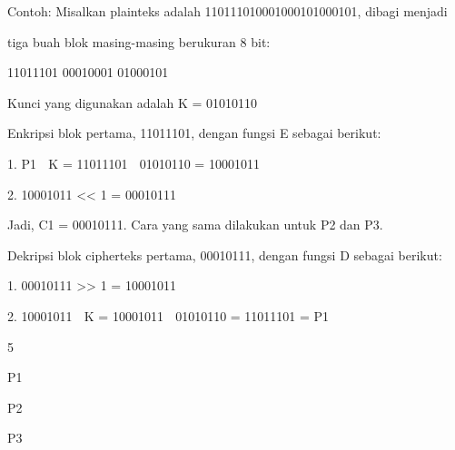 \documentclass{article}
\begin{document}

Contoh: Misalkan plainteks adalah 110111010001000101000101, dibagi menjadi 

tiga buah blok masing-masing berukuran 8 bit:


 11011101     00010001      01000101

Kunci yang digunakan adalah K = 01010110 

Enkripsi blok pertama, 11011101,  dengan fungsi E sebagai berikut:


 1.  P1  K = 11011101   01010110 = 10001011


 2.  10001011 << 1 = 00010111

Jadi,  C1 = 00010111. Cara yang sama dilakukan untuk P2 dan P3.

Dekripsi blok cipherteks pertama, 00010111, dengan fungsi D sebagai berikut:


1.  00010111 >> 1 = 10001011 


2.  10001011  K = 10001011  01010110 = 11011101 = P1

5

P1 

          P2  

        P3
\end{document}
